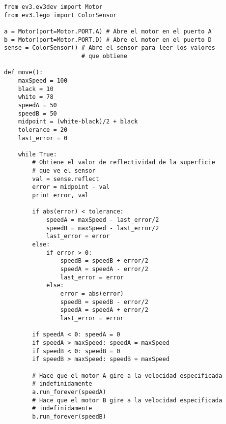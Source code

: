 \begin{verbatim}
  from ev3.ev3dev import Motor
  from ev3.lego import ColorSensor

  a = Motor(port=Motor.PORT.A) # Abre el motor en el puerto A
  b = Motor(port=Motor.PORT.D) # Abre el motor en el puerto D
  sense = ColorSensor() # Abre el sensor para leer los valores
                        # que obtiene

  def move():
      maxSpeed = 100
      black = 10
      white = 78
      speedA = 50
      speedB = 50
      midpoint = (white-black)/2 + black
      tolerance = 20
      last_error = 0

      while True:
          # Obtiene el valor de reflectividad de la superficie
          # que ve el sensor
          val = sense.reflect 
          error = midpoint - val
          print error, val

          if abs(error) < tolerance:
              speedA = maxSpeed - last_error/2
              speedB = maxSpeed - last_error/2
              last_error = error
          else:
              if error > 0:
                  speedB = speedB + error/2
                  speedA = speedA - error/2
                  last_error = error
              else:
                  error = abs(error)
                  speedB = speedB - error/2
                  speedA = speedA + error/2
                  last_error = error

          if speedA < 0: speedA = 0
          if speedA > maxSpeed: speedA = maxSpeed
          if speedB < 0: speedB = 0
          if speedB > maxSpeed: speedB = maxSpeed

          # Hace que el motor A gire a la velocidad especificada
          # indefinidamente
          a.run_forever(speedA) 
          # Hace que el motor B gire a la velocidad especificada
          # indefinidamente
          b.run_forever(speedB) 
\end{verbatim}